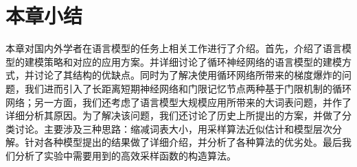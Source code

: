 \section{本章小结}
本章对国内外学者在语言模型的任务上相关工作进行了介绍。首先，介绍了语言模型的建模策略和对应的应用方案。并详细讨论了循环神经网络的语言模型的建模方式，并讨论了其结构的优缺点。同时为了解决使用循环网络所带来的梯度爆炸的问题，我们进而引入了长距离短期神经网络和门限记忆节点两种基于门限机制的循环网络；另一方面，我们还考虑了语言模型大规模应用所带来的大词表问题，并作了详细分析其原因。为了解决该问题，我们还讨论了历史上所提出的方案，并做了分类讨论。主要涉及三种思路：缩减词表大小，用采样算法近似估计和模型层次分解。针对各种模型提出的结果做了详细介绍，并分析了各种算法的优劣处。最后我们分析了实验中需要用到的高效采样函数的构造算法。